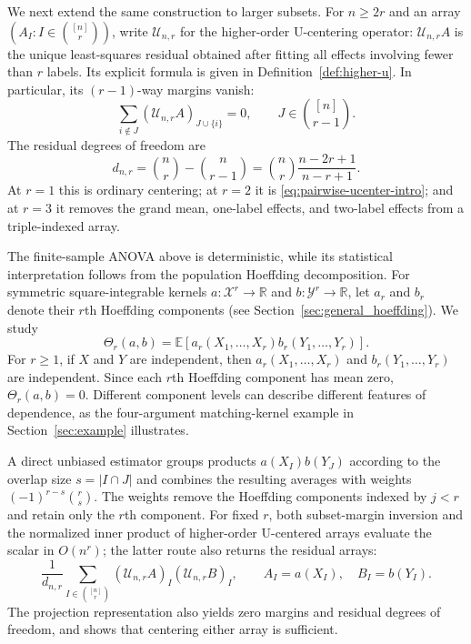 \documentclass[11pt]{article}
\theoremstyle{plain}
\theoremstyle{definition}
\theoremstyle{remark}
\newcommand{\R}{\mathbb R}
\newcommand{\E}{\mathbb E}
\newcommand{\cU}{\mathcal U}
\begin{document}
We next extend the same construction to larger subsets.  For $n\ge2r$ and an array
$(A_I:I\in\binom{[n]}r)$, write $\cU_{n,r}$ for the higher-order U-centering
operator: $\cU_{n,r}A$ is the unique least-squares residual obtained after
fitting all effects involving fewer than $r$ labels.  Its explicit formula is
given in Definition~\ref{def:higher-u}.  In particular, its $(r-1)$-way
margins vanish:
  \begin{equation*}
 \sum_{i\notin J}(\cU_{n,r}A)_{J\cup\{i\}}=0,
 \qquad J\in\binom{[n]}{r-1}.
\end{equation*}
The residual degrees of freedom are
\[
 d_{n,r}
 =\binom nr-\binom n{r-1}
 =\binom nr\frac{n-2r+1}{n-r+1}.
\]
At $r=1$ this is ordinary centering; at $r=2$ it is
\eqref{eq:pairwise-ucenter-intro}; and at $r=3$ it removes the grand mean,
one-label effects, and two-label effects from a triple-indexed array.

The finite-sample ANOVA above is deterministic, while its statistical
interpretation follows from the population Hoeffding decomposition.  For
symmetric square-integrable kernels $a:\mathcal X^r\to\R$ and
$b:\mathcal Y^r\to\R$, let $a_r$ and $b_r$ denote their $r$th
Hoeffding components (see Section~\ref{sec:general_hoeffding}).  We study
  \begin{equation*}
 \Theta_r(a,b)
 =\E\!\left[a_r(X_1,\ldots,X_r)b_r(Y_1,\ldots,Y_r)\right].
\end{equation*}
For $r\ge1$, if $X$ and $Y$ are independent, then
$a_r(X_1,\ldots,X_r)$ and $b_r(Y_1,\ldots,Y_r)$ are independent.  Since each
$r$th Hoeffding component has mean zero, $\Theta_r(a,b)=0$.
Different component levels can describe different features of dependence, as
the four-argument matching-kernel example in Section~\ref{sec:example}
illustrates.

A direct unbiased estimator groups products $a(X_I)b(Y_J)$ according to the
overlap size $s=|I\cap J|$ and combines the resulting averages with weights
$(-1)^{r-s}\binom rs$.  The weights remove the Hoeffding components indexed
by $j<r$ and retain only the $r$th component.  For fixed $r$, both subset-margin
inversion and the normalized inner product of higher-order U-centered arrays
evaluate the scalar in $O(n^r)$; the latter route also returns the residual
arrays:
  \begin{equation*}
 \frac{1}{d_{n,r}}
 \sum_{I\in\binom{[n]}r}
 (\cU_{n,r}A)_I(\cU_{n,r}B)_I,
 \qquad A_I=a(X_I),\quad B_I=b(Y_I).
\end{equation*}
The projection representation also yields zero margins and residual degrees
of freedom, and shows that centering either array is sufficient.
\end{document}
